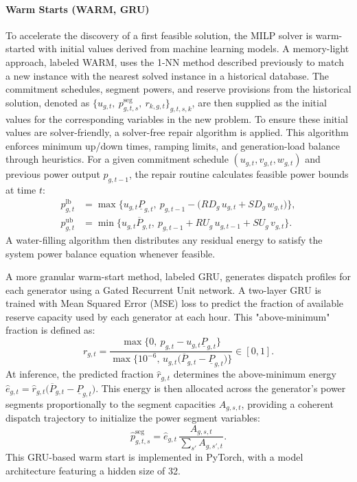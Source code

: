 \documentclass{ieeeaccess}
\begin{document}
\paragraph{Warm Starts (WARM, GRU)}
To accelerate the discovery of a first feasible solution, the MILP solver is warm-started with initial values derived from machine learning models. A memory-light approach, labeled WARM, uses the 1-NN method described previously to match a new instance with the nearest solved instance in a historical database. The commitment schedules, segment powers, and reserve provisions from the historical solution, denoted as $\big\{u_{g,t},\ p^{\mathrm{seg}}_{g,t,s},\ r_{k,g,t}\big\}_{g,t,s,k}$, are then supplied as the initial values for the corresponding variables in the new problem. To ensure these initial values are solver-friendly, a solver-free repair algorithm is applied. This algorithm enforces minimum up/down times, ramping limits, and generation-load balance through heuristics. For a given commitment schedule $(u_{g,t},v_{g,t},w_{g,t})$ and previous power output $p_{g,t-1}$, the repair routine calculates feasible power bounds at time $t$:
\begin{align}
p^{\mathrm{lb}}_{g,t}&=\max\!\Big\{u_{g,t}\underline{P}_{g,t},\ p_{g,t-1}-\big(RD_g\,u_{g,t}+SD_g\,w_{g,t}\big)\Big\}, \\
p^{\mathrm{ub}}_{g,t}&=\min\!\Big\{u_{g,t}\overline{P}_{g,t},\ p_{g,t-1}+RU_g\,u_{g,t-1}+SU_g\,v_{g,t}\Big\}.
\end{align}
A water-filling algorithm then distributes any residual energy to satisfy the system power balance equation whenever feasible.

A more granular warm-start method, labeled GRU, generates dispatch profiles for each generator using a Gated Recurrent Unit network. A two-layer GRU is trained with Mean Squared Error (MSE) loss to predict the fraction of available reserve capacity used by each generator at each hour. This "above-minimum" fraction is defined as:
\begin{equation}
r_{g,t}=\frac{\max\{0,\ p_{g,t}-u_{g,t}\underline{P}_{g,t}\}}{\max\{10^{-6},\,u_{g,t}\big(\overline{P}_{g,t}-\underline{P}_{g,t}\big)\}}\in[0,1].
\end{equation}
At inference, the predicted fraction $\hat r_{g,t}$ determines the above-minimum energy $\hat e_{g,t}=\hat r_{g,t}\big(\overline{P}_{g,t}-\underline{P}_{g,t}\big)$. This energy is then allocated across the generator's power segments proportionally to the segment capacities $A_{g,s,t}$, providing a coherent dispatch trajectory to initialize the power segment variables:
\begin{equation}
\hat p^{\mathrm{seg}}_{g,t,s}=\hat e_{g,t}\,\frac{A_{g,s,t}}{\sum_{s'}A_{g,s',t}}.
\end{equation}
This GRU-based warm start is implemented in PyTorch, with a model architecture featuring a hidden size of 32.
\end{document}
